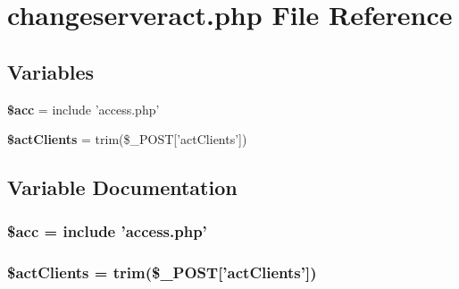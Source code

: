 \section{changeserveract.php File Reference}
\label{changeserveract_8php}


\subsection*{Variables}
\begin{CompactItemize}
\item 
{\bf \$acc} = include 'access.php'
\item 
{\bf \$act\-Clients} = trim(\$\_\-POST['act\-Clients'])
\end{CompactItemize}


\subsection{Variable Documentation}
\subsubsection{\setlength{\rightskip}{0pt plus 5cm}\$acc = include 'access.php'}\label{changeserveract_8php_542926c588a05eb69553d79c83cf73da}


\subsubsection{\setlength{\rightskip}{0pt plus 5cm}\$act\-Clients = trim(\$\_\-POST['act\-Clients'])}\label{changeserveract_8php_7128be622f4380d2d04f03e1b2037134}


